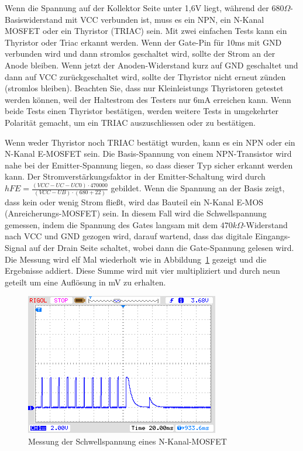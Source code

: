 Wenn die Spannung auf der Kollektor Seite unter 1,6V liegt, während der \(680\Omega\)-Basiswiderstand mit
VCC verbunden ist, muss es ein NPN, ein N-Kanal MOSFET oder ein Thyristor (TRIAC) sein.
Mit zwei einfachen Tests kann ein Thyristor oder Triac erkannt werden.
Wenn der Gate-Pin für 10ms mit GND verbunden wird und dann stromlos geschaltet wird, sollte
der Strom an der Anode bleiben.
Wenn jetzt der Anoden-Widerstand kurz auf GND geschaltet und dann auf VCC zurückgeschaltet wird,
sollte der Thyristor nicht erneut zünden (stromlos bleiben).
Beachten Sie, dass nur Kleinleistungs Thyristoren getestet werden können, weil der Haltestrom des
Testers nur 6mA erreichen kann.
Wenn beide Tests einen Thyristor bestätigen, werden weitere Tests in umgekehrter Polarität gemacht,
um ein TRIAC auszuschliessen oder zu bestätigen.

Wenn weder Thyristor noch TRIAC bestätigt wurden, kann es ein NPN oder ein N-Kanal E-MOSFET sein.
Die Basis-Spannung von einem NPN-Transistor wird nahe bei der Emitter-Spannung liegen, so dass dieser Typ sicher
erkannt werden kann.
Der Stromverstärkungsfaktor in der Emitter-Schaltung wird durch \(hFE = \frac{(VCC-UC-UC0)\cdot 470000}{(VCC-UB)\cdot (680+22)}\) 
gebildet.
Wenn die Spannung an der Basis zeigt, dass kein oder wenig Strom fließt, wird das Bauteil ein N-Kanal E-MOS
(Anreicherungs-MOSFET) sein. In diesem Fall wird die Schwellspannung gemessen, indem die Spannung des Gates langsam mit
dem \(470k\Omega\)-Widerstand nach VCC und GND gezogen wird, darauf wartend, dass das digitale
Eingangs-Signal auf der Drain Seite schaltet, wobei dann die Gate-Spannung gelesen wird.
Die Messung wird elf Mal wiederholt wie in Abbildung~\ref{fig:eleven} gezeigt und die Ergebnisse addiert.
Diese Summe wird mit vier multipliziert und durch neun geteilt um eine Auflösung in mV zu erhalten.
\begin{figure}[H]
\centering
\includegraphics[]{../PNG/IRFU120gate.png}
\caption{Messung der Schwellspannung eines N-Kanal-MOSFET}
\label{fig:eleven}
\end{figure}


